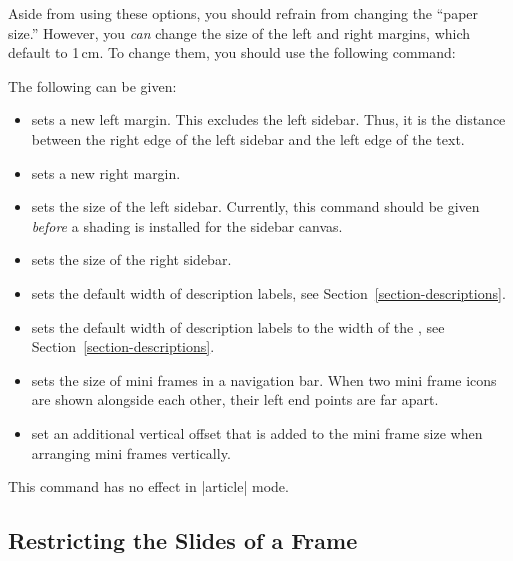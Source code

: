 Aside from using these options, you should refrain from changing the ``paper size.'' However, you \emph{can} change the size of the left and right margins, which default to 1\,cm. To change them, you should use the following command:

\begin{command}{\setbeamersize{}}
  The following  can be given:
  \begin{itemize}
  \item
     sets a new left margin. This excludes the left sidebar. Thus, it is the distance between the right edge of the left sidebar and the left edge of the text.
  \item
     sets a new right margin.
  \item
     sets the size of the left sidebar. Currently, this command should be given \emph{before} a shading is installed for the sidebar canvas.
  \item
     sets the size of the right sidebar.
  \item
     sets the default width of description labels, see Section~\ref{section-descriptions}.
  \item
     sets the default width of description labels to the width of the , see Section~\ref{section-descriptions}.
  \item
     sets the size of mini frames in a navigation bar. When two mini frame icons are shown alongside each other, their left end points are  far apart.
  \item
     set an additional vertical offset that is added to the mini frame size when arranging mini frames vertically.
  \end{itemize}

  \articlenote
  This command has no effect in |article| mode.
\end{command}


\subsection{Restricting the Slides of a Frame}
\label{section-restriction}

